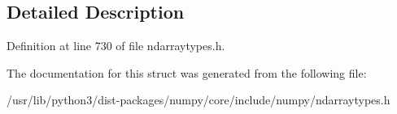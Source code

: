 \subsection{Detailed Description}


Definition at line 730 of file ndarraytypes.\+h.



The documentation for this struct was generated from the following file\+:\begin{DoxyCompactItemize}
\item 
/usr/lib/python3/dist-\/packages/numpy/core/include/numpy/ndarraytypes.\+h\end{DoxyCompactItemize}

